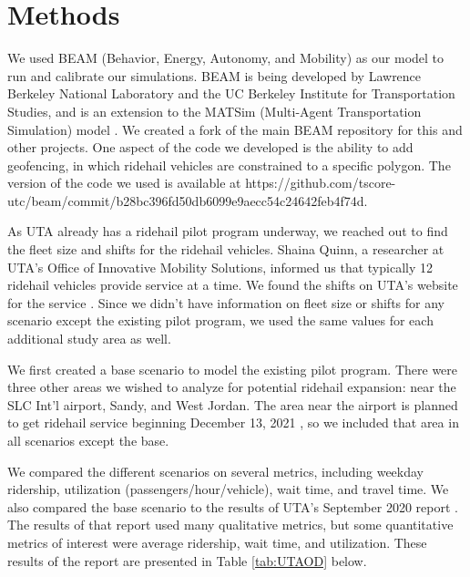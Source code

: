 \documentclass[3p, authoryear]{elsarticle} %
\begin{document}
\hypertarget{methods}{%
\section{Methods}\label{methods}}

We used BEAM (Behavior, Energy, Autonomy, and Mobility) as our model to run and calibrate our simulations. BEAM is being developed by Lawrence Berkeley National Laboratory and the UC Berkeley Institute for Transportation Studies, and is an extension to the MATSim (Multi-Agent Transportation Simulation) model \citep{beamdocs}. We created a fork of the main BEAM repository for this and other projects. One aspect of the code we developed is the ability to add geofencing, in which ridehail vehicles are constrained to a specific polygon. The version of the code we used is available at https://github.com/tscore-utc/beam/commit/b28bc396fd50db6099e9aecc54c24642feb4f74d.

As UTA already has a ridehail pilot program underway, we reached out to find the fleet size and shifts for the ridehail vehicles. Shaina Quinn, a researcher at UTA's Office of Innovative Mobility Solutions, informed us that typically 12 ridehail vehicles provide service at a time. We found the shifts on UTA's website for the service \citep{SLCSouth}. Since we didn't have information on fleet size or shifts for any scenario except the existing pilot program, we used the same values for each additional study area as well.

We first created a base scenario to model the existing pilot program. There were three other areas we wished to analyze for potential ridehail expansion: near the SLC Int'l airport, Sandy, and West Jordan. The area near the airport is planned to get ridehail service beginning December 13, 2021 \citep{Airport}, so we included that area in all scenarios except the base.

We compared the different scenarios on several metrics, including weekday ridership, utilization (passengers/hour/vehicle), wait time, and travel time. We also compared the base scenario to the results of UTA's September 2020 report \citep{UTAreport}. The results of that report used many qualitative metrics, but some quantitative metrics of interest were average ridership, wait time, and utilization. These results of the report are presented in Table \ref{tab:UTAOD} below.
\end{document}
